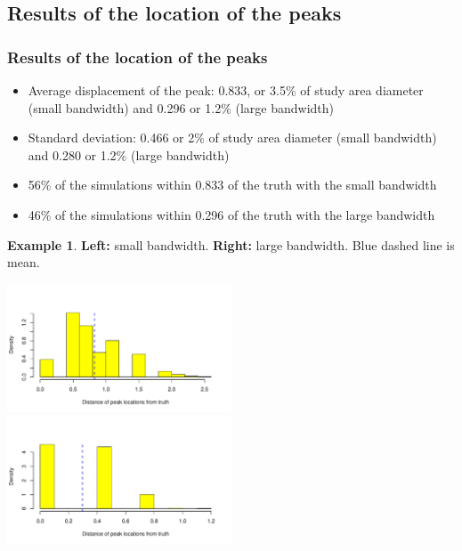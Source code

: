 \documentclass[notheorems]{beamer}
\theoremstyle{definition}
\theoremstyle{example}
\newtheorem{example}{Example}
\begin{document}
\subsection{Results of the location of the peaks}
\begin{frame}\frametitle{Results of the location of the peaks}
    \footnotesize
    \begin{itemize}
        \item Average displacement of the peak: 0.833, or 3.5\% of study area diameter (small bandwidth) and 0.296 or 1.2\% (large bandwidth)
        \item Standard deviation: 0.466 or 2\% of study area diameter (small bandwidth) and 0.280 or 1.2\% (large bandwidth)
        \item 56\% of the simulations within 0.833 of the truth with the small bandwidth
        \item 46\% of the simulations within 0.296 of the truth with the large bandwidth
    \end{itemize}
    \begin{example}{\tiny{\textbf{Left:} small bandwidth. \textbf{Right:} large bandwidth. {\color{blue}Blue dashed} line is mean.}}
    \centerline{
        \label{fig:peaks-loations-hist}
        \centering
        \includegraphics[width=0.5\textwidth]{peaks-hist-locations-undersmooth}
        \includegraphics[width=0.5\textwidth]{peaks-hist-locations-oversmooth}
     }
    \end{example}
\end{frame}

\end{document}
